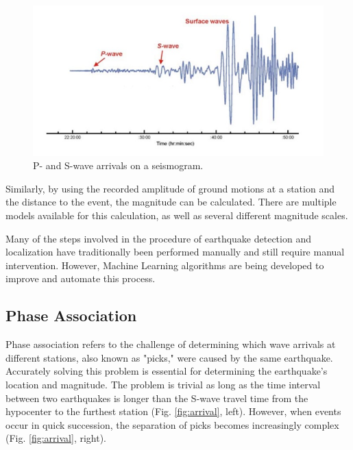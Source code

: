 \documentclass{scrreprt}
\begin{document}
\begin{figure}[ht]
    \centering
    \includegraphics[width=0.5\linewidth]{plots/Wave_arrival_BGS.jpg}
    \caption{P- and S-wave arrivals on a seismogram.\citep{fig-waves}}
    \label{fig:wave_arrivals}
\end{figure}

Similarly, by using the recorded amplitude of ground motions at a station and the distance to the event, the magnitude can be calculated. There are multiple models available for this calculation, as well as several different magnitude scales.

Many of the steps involved in the procedure of earthquake detection and localization have traditionally been performed manually and still require manual intervention. However, Machine Learning algorithms are being developed to improve and automate this process.

\subsection{Phase Association}
Phase association refers to the challenge of determining which wave arrivals at different stations, also known as "picks," were caused by the same earthquake. Accurately solving this problem is essential for determining the earthquake's location and magnitude. The problem is trivial as long as the time interval between two earthquakes is longer than the S-wave travel time from the hypocenter to the furthest station (Fig. \ref{fig:arrival}, left). However, when events occur in quick succession, the separation of picks becomes increasingly complex (Fig. \ref{fig:arrival}, right).
\end{document}
